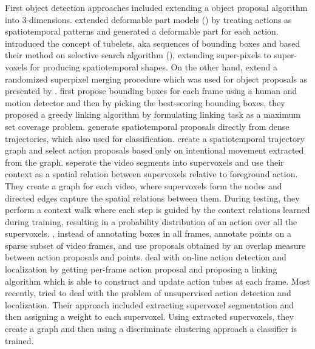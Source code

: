 First object detection approaches included extending a object proposal algorithm into 3-dimensions. \cite{6619185} extended deformable part models (\cite{5255236})  by treating actions as spatiotemporal patterns and generated a deformable part for each action. \cite{6909495} introduced the concept of tubelets, aka sequences of bounding boxes and based their method on selective search algorithm
(\cite{Uijlings13}), extending super-pixels to super-voxels for producing spatiotemporal shapes. On the other hand, \cite{Oneata}
extend a randomized superpixel merging procedure which was used for object proposals as presented by \cite{Manen:2013:POP:2586117.2587333}.
\cite{7298735} first propose bounding boxes for each frame using a human and motion detector and then by picking the best-scoring bounding boxes,
they proposed a greedy linking algorithm by formulating linking task as a maximum set coverage problem. \cite{BMVC2015_177} generate spatiotemporal proposals directly from dense trajectories, which also used for classification. \cite{7410734} create a spatiotemporal trajectory
graph and select action proposals based only on intentional movement extracted from the graph. \cite{7410732} seperate the video segments
into supervoxels and use their context as a spatial relation between supervoxels relative to foreground action. They create a graph for each
video, where supervoxels form the nodes and directed edges capture the spatial relations between them. During testing, they  perform a context
walk where each step is guided by the context relations learned during training, resulting in a probability distribution of an action over all the supervoxels. \cite{DBLP:journals/corr/MettesGS16}, instead of annotating boxes in all frames, annotate points on a sparse subset of video
frames, and use proposals obtained by an overlap measure between action proposals and points. \cite{DBLP:journals/corr/BehlSSSCT17} deal with
on-line action detection and localization by getting per-frame action proposal and  proposing a linking algorithm which is able to construct and update action tubes at each frame.
Most recently, \cite{8237344} tried to deal with the problem of unsupervised
action detection and localization. Their approach included extracting supervoxel segmentation and then assigning a weight to each supervoxel.
Using extracted supervoxels, they create a graph and then using a discriminate clustering approach a classifier is trained.\par

\par

